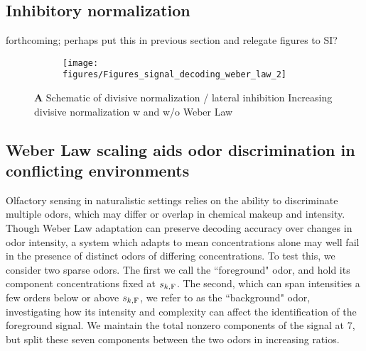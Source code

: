 \subsection{Inhibitory normalization}



{\color{blue} forthcoming; perhaps put this in previous section and relegate figures to SI?}





\begin{figure}
	\begin{subfigure}[t]{\linewidth}
		\texttt{[image: figures/Figures\_signal\_decoding\_weber\_law\_2]}
		\label{fig:divisive_normalization_a}
	\end{subfigure}
	\begin{subfigure}[t]{\linewidth}
		\label{fig:divisive_normalization_b}
	\end{subfigure}
	\caption{\textbf{A} Schematic of divisive normalization / lateral inhibition  Increasing divisive normalization w and w/o Weber Law}
	\label{fig:divisive_normalization}
\end{figure}






\subsection{Weber Law scaling aids odor discrimination in conflicting environments}


Olfactory sensing in naturalistic settings relies on the ability to discriminate multiple odors, which may differ or overlap in chemical makeup and intensity. Though Weber Law adaptation can preserve decoding accuracy over changes in odor intensity, a system which adapts to mean concentrations alone may well fail in the presence of distinct odors of differing concentrations. To test this, we consider two sparse odors. The first we call the ``foreground" odor, and hold its component concentrations fixed at $s_{k, \text F}$. The second, which can span intensities a few orders below or above $s_{k, \text F}$, we refer to as the ``background" odor, investigating how its intensity and complexity can affect the identification of the foreground signal. We maintain the total nonzero components of the signal at 7, but split these seven components between the two odors in increasing ratios. 


